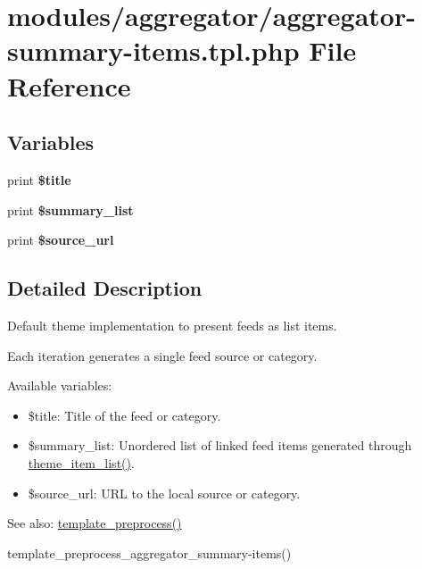 \hypertarget{aggregator-summary-items_8tpl_8php}{
\section{modules/aggregator/aggregator-summary-items.tpl.php File Reference}
\label{aggregator-summary-items_8tpl_8php}
}
\subsection*{Variables}
\begin{CompactItemize}
\item 
\hypertarget{aggregator-summary-items_8tpl_8php_ec2795512d255332f57cacd930a090b4}{
print \textbf{\$title}}
\label{aggregator-summary-items_8tpl_8php_ec2795512d255332f57cacd930a090b4}

\item 
\hypertarget{aggregator-summary-items_8tpl_8php_5411b138c200de3cea9a4d1dc628dc18}{
print \textbf{\$summary\_\-list}}
\label{aggregator-summary-items_8tpl_8php_5411b138c200de3cea9a4d1dc628dc18}

\item 
\hypertarget{aggregator-summary-items_8tpl_8php_c28b1457ba0a04cbe629056c40639fd5}{
print \textbf{\$source\_\-url}}
\label{aggregator-summary-items_8tpl_8php_c28b1457ba0a04cbe629056c40639fd5}

\end{CompactItemize}


\subsection{Detailed Description}
Default theme implementation to present feeds as list items.

Each iteration generates a single feed source or category.

Available variables:\begin{itemize}
\item \$title: Title of the feed or category.\item \$summary\_\-list: Unordered list of linked feed items generated through \hyperlink{group__themeable_g0f8d002d54905d758e38a3d516cbfe69}{theme\_\-item\_\-list()}.\item \$source\_\-url: URL to the local source or category.\end{itemize}


\begin{Desc}
\item[See also:]\hyperlink{includes_2theme_8inc_3eeb7bcdba7ef4859f99586da264d347}{template\_\-preprocess()} 

template\_\-preprocess\_\-aggregator\_\-summary-items() \end{Desc}
